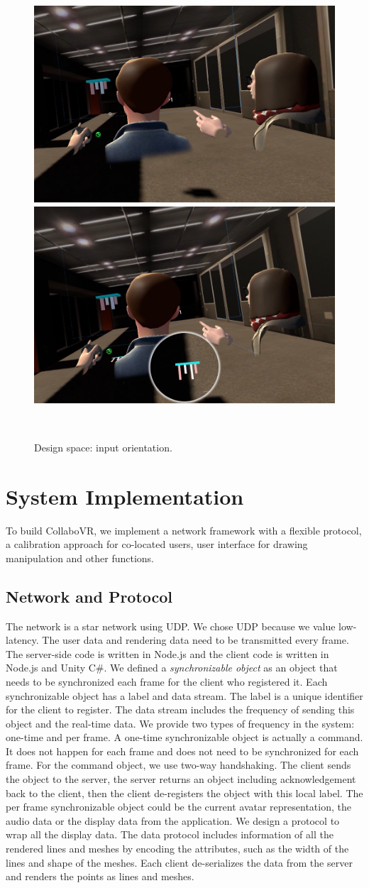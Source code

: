 \documentclass{sigchi}
\begin{document}
\begin{figure}[b!]
 \centering
 \includegraphics[width=0.45\columnwidth]{Figure4-1.png}
 \includegraphics[width=0.45\columnwidth]{Figure4-2.png}
 \caption{Design space: input orientation.
 }~\label{fig:inputorientation}
\end{figure}

\section{System Implementation}
To build CollaboVR, we implement a network framework with a flexible protocol, a calibration approach for co-located users, user interface for drawing manipulation and other functions.

\subsection{Network and Protocol}
The network is a star network using UDP. We chose UDP because we value low-latency. The user data and rendering data need to be transmitted every frame. The server-side code is written in Node.js and the client code is written in Node.js and Unity C\#. We defined a \textit{synchronizable object} as an object that needs to be synchronized each frame for the client who registered it. Each synchronizable object has a label and data stream. The label is a unique identifier for the client to register. The data stream includes the frequency of sending this object and the real-time data. We provide two types of frequency in the system: one-time and per frame. A one-time synchronizable object is actually a command. It does not happen for each frame and does not need to be synchronized for each frame. For the command object, we use two-way handshaking. The client sends the object to the server, the server returns an object including acknowledgement back to the client, then the client de-registers the object with this local label. The per frame synchronizable object could be the current avatar representation, the audio data or the display data from the application. We design a protocol to wrap all the display data. The data protocol includes information of all the rendered lines and meshes by encoding the attributes, such as the width of the lines and shape of the meshes. Each client de-serializes the data from the server and renders the points as lines and meshes.
\end{document}
